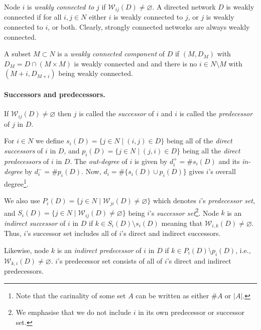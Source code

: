 Node $i$ is \textit{weakly connected to} $j$ if $\mathcal{W}_{ij}(D) \neq \varnothing$. A directed network $D$ is weakly connected if for all $i,j \in N$ either $i$ is weakly connected to $j$, or $j$ is weakly connected to $i$, or both. Clearly, strongly connected networks are always weakly connected.

A subset $M \subset N$ is a \emph{weakly connected component} of $D$ if $(M, D_M)$ with $D_M = D \cap (M \times M)$ is weakly connected and and there is no $i \in N \setminus M$ with $(M+i, D_{M+i})$ being weakly connected.

\paragraph{Successors and predecessors.}

If $\mathcal{W}_{ij} (D) \neq \varnothing$ then $j$ is called the \textit{successor} of $i$ and $i$ is called the \textit{predecessor} of $j$ in $D$.

For $i \in N$ we define $s_{i}(D) = \{ j \in N \mid (i,j) \in D \}$ being all of the \textit{direct successors} of $i$ in $D$, and $p_{i}(D)=\{j \in N \mid (j,i) \in D\}$ being all the \textit{direct predecessors} of $i$ in $D$. The \emph{out-degree} of $i$ is given by $d_{i}^{+} = \# s_{i}(D)$ and its \emph{in-degree} by $d_{i}^{-}= \# p_{i}(D)$. Now, $d_{i} = \# \{ s_{i} (D) \cup p_{i} (D) \}$ gives $i$'s overall degree\footnote{Note that the carinality of some set $A$ can be written as either $\#A$ or $|A|$.}.

We also use $P_{i}(D)=\{j \in N \mid \mathcal{W}_{ji}(D) \neq \varnothing \}$ which denotes $i$'s \textit{predecessor set}, and $S_{i}(D)= \{j \in N \mid \mathcal{W}_{ij}(D) \neq \varnothing \}$ being $i$'s \textit{successor set}\footnote{We emphasise that we do not include $i$ in its own predecessor or successor set.}. Node $k$ is an \emph{indirect successor} of $i$ in $D$ if $k \in S_{i}(D) \setminus s_i (D)$ meaning that $\mathcal{W}_{i,k}(D) \neq \varnothing$. Thus, $i$'s successor set includes all of $i$'s direct and indirect successors.

Likewise, node $k$ is an \emph{indirect predecessor} of $i$ in $D$ if $k \in P_{i}(D) \setminus p_{i}(D)$, i.e., $\mathcal{W}_{k,i}(D) \neq \varnothing$. $i$'s predecessor set consists of all of $i$'s direct and indirect predecessors.

